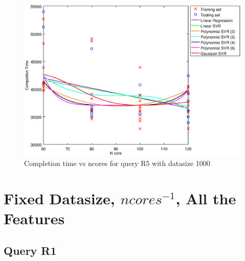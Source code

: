 \documentclass[a4paper,11pt]{article}
\begin{document}
\begin {figure}[hbtp]
\centering
\includegraphics[width=\textwidth]{output/R5_1000_ONLY_1_LINEAR_NCORE/plot_R5_1000.eps}
\caption{Completion time vs ncores for query R5 with datasize 1000}
\label{fig:coreonly_linear_R5_1000}
\end {figure}


\newpage
\section{Fixed Datasize, $ncores^{-1}$, All the Features}
\subsection{Query R1}
\end{document}
